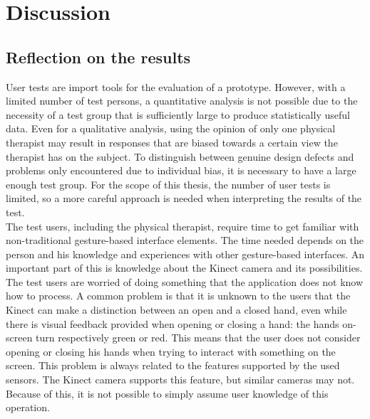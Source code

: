 \chapter{Discussion}


\section{Reflection on the results}

User tests are import tools for the evaluation of a prototype. However, with a limited number of test persons, a quantitative analysis is not possible due to the necessity of a test group that is sufficiently large to produce statistically useful data. Even for a qualitative analysis, using the opinion of only one physical therapist may result in responses that are biased towards a certain view the therapist has on the subject. To distinguish between genuine design defects and problems only encountered due to individual bias, it is necessary to have a large enough test group. For the scope of this thesis, the number of user tests is limited, so a more careful approach is needed when interpreting the results of the test.\\

The test users, including the physical therapist, require time to get familiar with non-traditional gesture-based interface elements. The time needed depends on the person and his knowledge and experiences with other gesture-based interfaces. An important part of this is knowledge about the Kinect camera and its possibilities. The test users are worried of doing something that the application does not know how to process. A common problem is that it is unknown to the users that the Kinect can make a distinction between an open and a closed hand, even while there is visual feedback provided when opening or closing a hand: the hands on-screen turn respectively green or red. This means that the user does not consider opening or closing his hands when trying to interact with something on the screen. This problem is always related to the features supported by the used sensors. The Kinect camera supports this feature, but similar cameras may not. Because of this, it is not possible to simply assume user knowledge of this operation.\\

